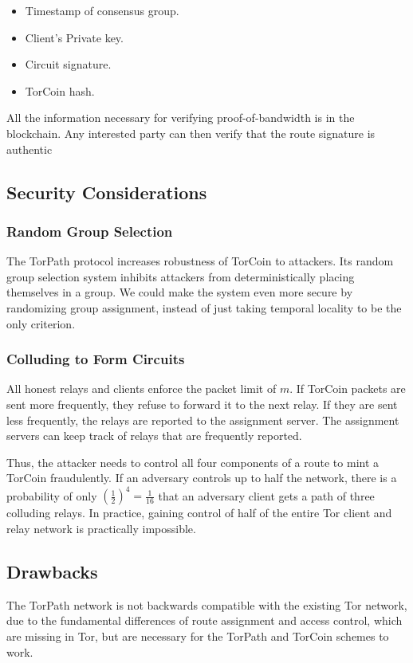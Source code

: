 \begin{itemize}
\item Timestamp of consensus group.
\item Client's Private key.
\item Circuit signature.
\item TorCoin hash.
\end{itemize}

All the information necessary for verifying proof-of-bandwidth is in the blockchain. 
Any interested party can then verify that the route signature is authentic 

\subsection{Security Considerations}

\subsubsection{Random Group Selection}
The TorPath protocol increases robustness of TorCoin to attackers. Its random group selection system inhibits attackers from deterministically placing themselves in a group. We could make the system even more secure by randomizing group assignment, instead of just taking temporal locality to be the only criterion.

\subsubsection{Colluding to Form Circuits}
All honest relays and clients enforce the packet limit of $m$. If TorCoin packets 
are sent more frequently, they refuse to forward it to the next relay. If they are
sent less frequently, the relays are reported to the assignment server. The
assignment servers can keep track of relays that are frequently reported.

Thus, the attacker needs to control all four components of a route to mint a TorCoin fraudulently. If an adversary controls up to half the network, there is a probability of only $(\frac{1}{2})^4 = \frac{1}{16}$ that an adversary client gets a path of three colluding relays. In practice, gaining control of half of the entire Tor client and relay network is practically impossible. 

\subsection{Drawbacks}
The TorPath network is not backwards compatible with the existing Tor network, due to the fundamental differences of route assignment and access control, which are missing in Tor, but are necessary for the TorPath and TorCoin schemes to work.

